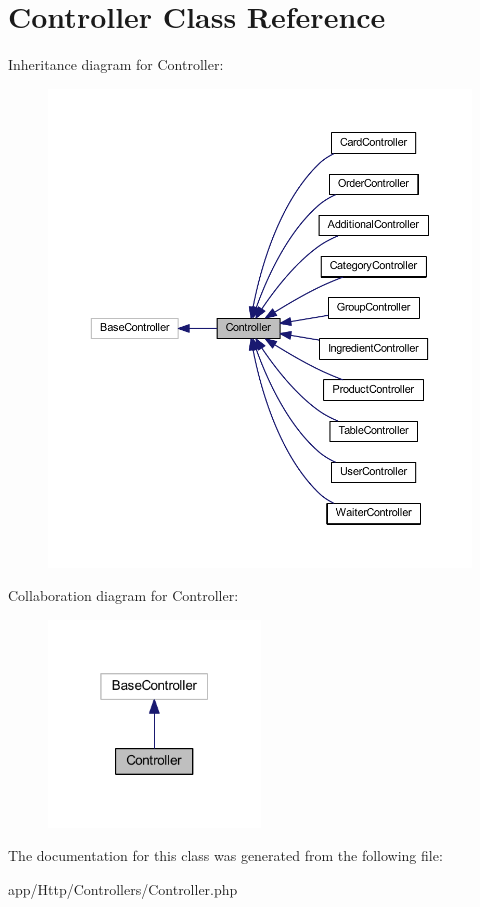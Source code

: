 \hypertarget{class_app_1_1_http_1_1_controllers_1_1_controller}{}\section{Controller Class Reference}
\label{class_app_1_1_http_1_1_controllers_1_1_controller}


Inheritance diagram for Controller\+:
\nopagebreak
\begin{figure}[H]
\begin{center}
\leavevmode
\includegraphics[width=350pt]{class_app_1_1_http_1_1_controllers_1_1_controller__inherit__graph}
\end{center}
\end{figure}


Collaboration diagram for Controller\+:
\nopagebreak
\begin{figure}[H]
\begin{center}
\leavevmode
\includegraphics[width=160pt]{class_app_1_1_http_1_1_controllers_1_1_controller__coll__graph}
\end{center}
\end{figure}


The documentation for this class was generated from the following file\+:\begin{DoxyCompactItemize}
\item 
app/\+Http/\+Controllers/Controller.\+php\end{DoxyCompactItemize}
